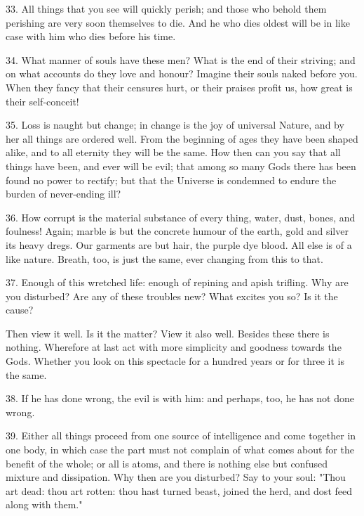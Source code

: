 \documentclass{book}
\begin{document}
33. All things that you see will quickly perish; and those who behold
them perishing are very soon themselves to die. And he who dies oldest
will be in like case with him who dies before his time.

34. What manner of souls have these men? What is the end of their
striving; and on what accounts do they love and honour? Imagine their
souls naked before you. When they fancy that their censures hurt, or
their praises profit us, how great is their self-conceit!

35. Loss is naught but change; in change is the joy of universal
Nature, and by her all things are ordered well. From the beginning of
ages they have been shaped alike, and to all eternity they will be the
same. How then can you say that all things have been, and ever will be
evil; that among so many Gods there has been found no power to
rectify; but that the Universe is condemned to endure the burden of
never-ending ill?

36. How corrupt is the material substance of every thing, water, dust,
bones, and foulness! Again; marble is but the concrete humour of the
earth, gold and silver its heavy dregs. Our garments are but hair, the
purple dye blood. All else is of a like nature. Breath, too, is just
the same, ever changing from this to that.

37. Enough of this wretched life: enough of repining and apish
trifling. Why are you disturbed? Are any of these troubles new? What
excites you so? Is it the cause?

Then view it well. Is it the matter? View it also well. Besides these
there is nothing. Wherefore at last act with more simplicity and
goodness towards the Gods. Whether you look on this spectacle for a
hundred years or for three it is the same.

38. If he has done wrong, the evil is with him: and perhaps, too, he
has not done wrong.

39. Either all things proceed from one source of intelligence and come
together in one body, in which case the part must not complain of what
comes about for the benefit of the whole; or all is atoms, and there
is nothing else but confused mixture and dissipation. Why then are you
disturbed? Say to your soul: "Thou art dead: thou art rotten: thou
hast turned beast, joined the herd, and dost feed along with them."
\end{document}

